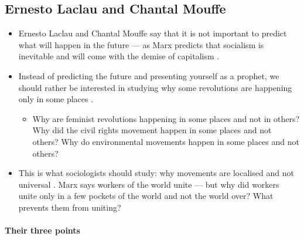 \subsection{Ernesto Laclau and Chantal Mouffe}
\begin{itemize}
    \item Ernesto Laclau and Chantal Mouffe say that it is not important to predict what will happen in the future --- as Marx predicts that socialism is inevitable and will come with the demise of capitalism .
    \item Instead of predicting the future and presenting yourself as a prophet, we should rather be interested in studying why some revolutions are happening only in some places .
    \begin{itemize}
        \item Why are feminist revolutions happening in some places and not in others?  Why did the civil rights movement happen in some places and not others?  Why do environmental movements happen in some places and not others? 
    \end{itemize}
    \item This is what sociologists should study: why movements are localised and not universal . Marx says workers of the world unite --- but why did workers unite only in a few pockets of the world and not the world over? What prevents them from uniting? 
\end{itemize}

\paragraph{Their three points}


